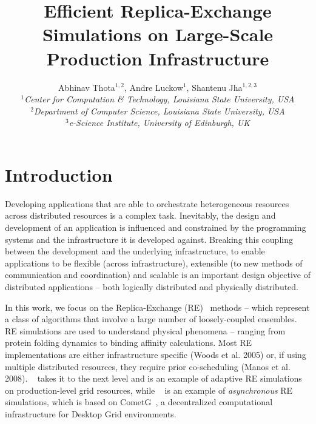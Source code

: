 \documentclass[a4paper,10pt]{article}
\begin{document}
\title{\LARGE Efficient Replica-Exchange Simulations on
  Large-Scale Production Infrastructure}
 
\author{Abhinav Thota$^{1,2}$, Andre Luckow$^{1}$, Shantenu Jha$^{1,2,3}$\\
   \small{\emph{$^{1}$Center for Computation \& Technology, Louisiana State University, USA}}\\
   \small{\emph{$^{2}$Department of Computer Science, Louisiana State University, USA}}\\
   \small{\emph{$^{3}$e-Science Institute, University of Edinburgh, UK}}
   }
 
\maketitle

\section{Introduction}
 
Developing applications that are able to orchestrate heterogeneous
resources across distributed resources is a complex task.  Inevitably,
the design and development of an application is influenced and
constrained by the programming systems and the infrastructure it is
developed against. Breaking this coupling between the development and
the underlying infrastructure, to enable applications to be flexible
(across infrastructure), extensible (to new methods of communication
and coordination) and scalable is an important design objective of
distributed applications -- both logically distributed and physically
distributed.

In this work, we focus on the Replica-Exchange (RE)~\cite{hansmann,Sugita:1999rm} 
methods -- which represent a class of
algorithms that involve a large number of loosely-coupled ensembles.
RE simulations are used to understand physical phenomena -- ranging
from protein folding dynamics to binding affinity calculations. Most RE implementations are either infrastructure specific (Woods et al. 2005)
or, if using multiple distributed resources, they require prior co-scheduling
(Manos et al. 2008). ~\cite{Luckow:2008fp} takes it to the next level and is an example of adaptive RE simulations on production-level grid resources, while ~\cite{parashar_arepex} is an example of \emph{asynchronous} RE simulations, which is based on CometG~\cite{Li:2005:CSC:1090948.1091381}, a decentralized computational infrastructure for Desktop Grid environments.
\end{document}
